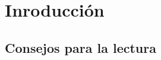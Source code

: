 \chapter{Inroducción}%
\label{cha:Inroducción}

\section*{Consejos para la lectura}%
\label{sec:Consejos para la lectura}

